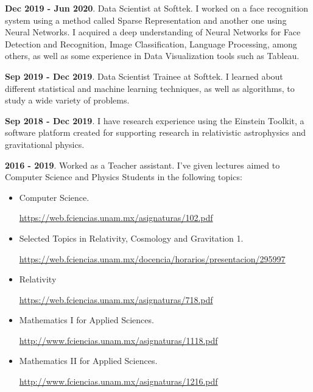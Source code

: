\documentclass[a4paper,10pt]{article} %
\begin{document}
\textbf{Dec 2019 - Jun 2020}. Data Scientist at Softtek. I worked on a face recognition system using a method called Sparse Representation and another one using Neural Networks. I acquired a deep understanding of Neural Networks for Face Detection and Recognition, Image Classification, Language Processing, among others, as well as some experience in Data Visualization tools such as Tableau.

\textbf{Sep 2019 - Dec 2019}. Data Scientist Trainee at Softtek. I learned about different statistical and machine learning techniques, as well as algorithms, to study a wide variety of problems.

\textbf{Sep 2018 - Dec 2019}. I have research experience using the Einstein Toolkit, a software platform created for supporting research in relativistic astrophysics and gravitational physics.

\textbf{2016 - 2019}. Worked as a Teacher assistant. I've given lectures aimed to Computer Science and Physics Students in the following topics:
\begin{itemize}
	\item Computer Science.
	
	\href{https://web.fciencias.unam.mx/asignaturas/102.pdf}{https://web.fciencias.unam.mx/asignaturas/102.pdf}
	
	\item Selected Topics in Relativity, Cosmology and Gravitation 1.
	
	\href{https://web.fciencias.unam.mx/docencia/horarios/presentacion/295997}{https://web.fciencias.unam.mx/docencia/horarios/presentacion/295997}
	
	\item Relativity
	
	\href{https://web.fciencias.unam.mx/asignaturas/718.pdf}{https://web.fciencias.unam.mx/asignaturas/718.pdf}
	
	\item Mathematics I for Applied Sciences. 
	
	\href{http://www.fciencias.unam.mx/asignaturas/1118.pdf}{http://www.fciencias.unam.mx/asignaturas/1118.pdf}
	
	\item Mathematics II for Applied Sciences.
	
	\href{http://www.fciencias.unam.mx/asignaturas/1216.pdf}{http://www.fciencias.unam.mx/asignaturas/1216.pdf}
\end{itemize}
\bigskip
\end{document}
